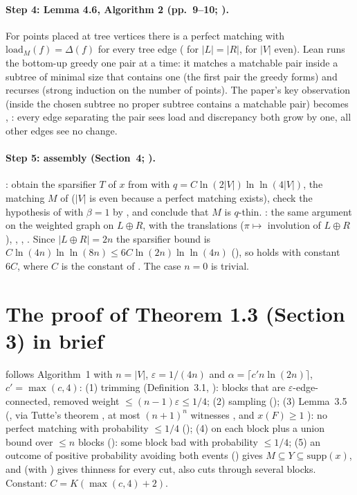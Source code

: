 \paragraph{Step 4: Lemma 4.6, Algorithm 2 (pp.~9--10; ).}
For points placed at tree vertices there is a perfect matching with $\mathrm{load}_M(f)=\Delta(f)$ for every
tree edge ( for $|L|=|R|$,  for $|V|$ even). Lean runs the bottom-up greedy
one pair at a time: it matches a matchable pair inside a subtree of minimal size that contains one (the
first pair the greedy forms) and recurses (strong induction on the number of points). The paper's key
observation (inside the chosen subtree no proper subtree contains a matchable pair) becomes
, : every edge separating the pair sees load and
discrepancy both grow by one, all other edges see no change.

\paragraph{Step 5: assembly (Section~4; ).}
: obtain the sparsifier $T$ of $x$ from  with $q=C\ln(2|V|)\ln\ln(4|V|)$,
the matching $M$ of  ($|V|$ is even because a perfect matching exists), check the hypothesis of
 with $\beta=1$ by , and conclude that $M$ is $q$-thin.
: the same argument on the weighted graph  on $L\oplus R$, with the
translations  ($\pi\mapsto$ involution of $L\oplus R$), ,
, . Since $|L\oplus R|=2n$ the sparsifier bound is
$C\ln(4n)\ln\ln(8n)\le6C\ln(2n)\ln\ln(4n)$ (), so  holds with
constant $6C$, where $C$ is the constant of . The case $n=0$ is trivial.

\section{The proof of Theorem 1.3 (Section 3) in brief}
 follows Algorithm~1 with $n=|V|$, $\varepsilon=1/(4n)$ and
$\alpha=\lceil c'n\ln(2n)\rceil$, $c'=\max(c,4)$: (1) trimming (Definition~3.1, ): blocks that are
$\varepsilon$-edge-connected, removed weight $\le(n-1)\varepsilon\le1/4$; (2) sampling ();
(3) Lemma~3.5 (, via Tutte's theorem , at most $(n+1)^n$ witnesses
, and $x(F)\ge1$ ): no perfect matching with probability
$\le1/4$ (); (4)  on each block plus a union bound over $\le n$ blocks
(): some block bad with probability $\le1/4$; (5) an outcome of positive probability
avoiding both events () gives $M\subseteq Y\subseteq\mathrm{supp}(x)$, and
 (with ) gives thinness for every cut, also cuts through
several blocks. Constant: $C=K(\max(c,4)+2)$.

